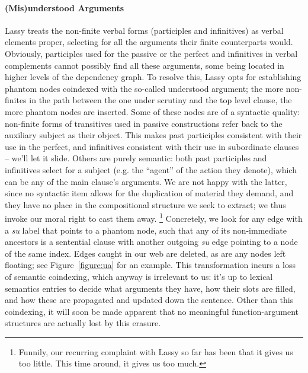 \paragraph{(Mis)understood Arguments}
Lassy treats the non-finite verbal forms (participles and infinitives) as verbal elements proper, selecting for all the arguments their finite counterparts would.
Obviously, participles used for the passive or the perfect and infinitives in verbal complements cannot possibly find all these arguments, some being located in higher levels of the dependency graph.
To resolve this, Lassy opts for establishing phantom nodes coindexed with the so-called understood argument; the more non-finites in the path between the one under scrutiny and the top level clause, the more phantom nodes are inserted.
Some of these nodes are of a syntactic quality:  non-finite forms of transitives used in passive constructions refer back to the auxiliary subject as their object.
This makes past participles consistent with their use in the perfect, and infinitives consistent with their use in subordinate clauses -- we'll let it slide.
Others are purely semantic: both past participles and infinitives select for a subject (e.g. the ``agent'' of the action they denote), which can be any of the main clause's arguments.
We are not happy with the latter, since no syntactic item allows for the duplication of material they demand, and they have no place in the compositional structure we seek to extract; we thus invoke our moral right to cast them away.%
	\footnote{Funnily, our recurring complaint with Lassy so far has been that it gives us too little. 
	This time around, it gives us too much.}
Concretely, we look for any edge with a \textit{su} label that points to a phantom node, such that any of its non-immediate ancestors is a sentential clause with another outgoing \textit{su} edge pointing to a node of the same index.
Edges caught in our web are deleted, as are any nodes left floating; see Figure~\ref{figure:ua} for an example.
This transformation incurs a loss of semantic coindexing, which anyway is irrelevant to us: it's up to lexical semantics entries to decide what arguments they have, how their slots are filled, and how these are propagated and updated down the sentence.
Other than this coindexing, it will soon be made apparent that no meaningful function-argument structures are actually lost by this erasure.


